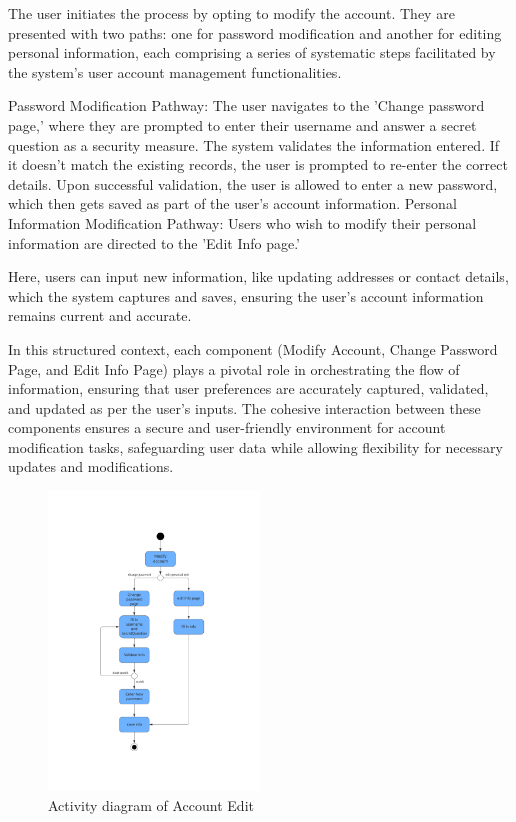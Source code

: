 \documentclass[conference]{IEEEtran}
\begin{document}
The user initiates the process by opting to modify the account. They are presented with two paths: one for password modification and another for editing personal information, each comprising a series of systematic steps facilitated by the system's user account management functionalities.

Password Modification Pathway:
The user navigates to the 'Change password page,' where they are prompted to enter their username and answer a secret question as a security measure.
The system validates the information entered. If it doesn't match the existing records, the user is prompted to re-enter the correct details.
Upon successful validation, the user is allowed to enter a new password, which then gets saved as part of the user's account information.
Personal Information Modification Pathway:
Users who wish to modify their personal information are directed to the 'Edit Info page.'

Here, users can input new information, like updating addresses or contact details, which the system captures and saves, ensuring the user's account information remains current and accurate.

In this structured context, each component (Modify Account, Change Password Page, and Edit Info Page) plays a pivotal role in orchestrating the flow of information, ensuring that user preferences are accurately captured, validated, and updated as per the user's inputs. The cohesive interaction between these components ensures a secure and user-friendly environment for account modification tasks, safeguarding user data while allowing flexibility for necessary updates and modifications.
\begin{figure}[htbp]
	\centerline{\includegraphics[width=0.5\textwidth]{Diagram_of_Editing_Info_and_Password/activity_diagram_of editing_and_Changing_psw.pdf}}
	\caption{Activity diagram of Account Edit }
	\label{activity_diagram_of editing_and_Changing_psw}
\end{figure}
\end{document}
